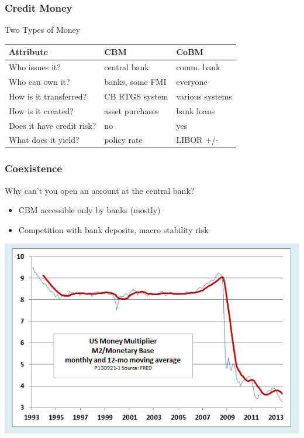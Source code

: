 \documentclass{beamer}
\begin{document}
\begin{frame}
  \frametitle{Credit Money}

  \begin{block}{Two Types of Money}
  \begin{tabular}{lll}
    Attribute                 & CBM & CoBM \\\hline
    Who issues it?            & central bank       & comm. bank\tabularnewline
    Who can own it?           & banks, some FMI    & everyone\tabularnewline
    How is it transferred?    & CB RTGS system     & various systems\tabularnewline
    How is it created?        & asset purchases    & bank loans\tabularnewline
    Does it have credit risk? & no                 & yes\tabularnewline
    What does it yield?       & policy rate        & LIBOR +/-\tabularnewline
  \end{tabular}
\end{block}

\end{frame}

\begin{frame}
  \frametitle{Coexistence}
  \begin{block}{}
    Why can't you open an account at the central bank? 
  \end{block}

  \begin{itemize}
  \item CBM accessible only by banks (mostly)
  \item Competition with bank deposits, macro stability risk
  \end{itemize}
  
\end{frame}

\begin{frame}
  \includegraphics[scale=0.65]{images/money-multiplier.png}
\end{frame}
\end{document}
